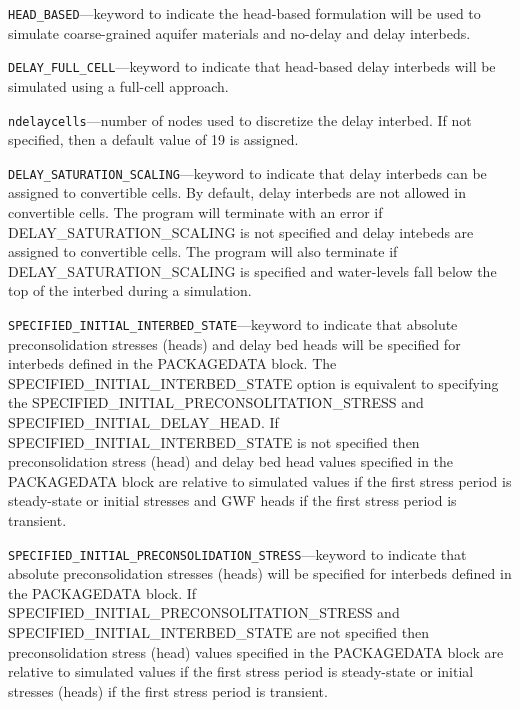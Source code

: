 \begin{description}
\item \texttt{HEAD\_BASED}---keyword to indicate the head-based formulation will be used to simulate coarse-grained aquifer materials and no-delay and delay interbeds.

\item \texttt{DELAY\_FULL\_CELL}---keyword to indicate that head-based delay interbeds will be simulated using a full-cell approach.

\item \texttt{ndelaycells}---number of nodes used to discretize the delay interbed. If not specified, then a default value of 19 is assigned.

\item \texttt{DELAY\_SATURATION\_SCALING}---keyword to indicate that delay interbeds can be assigned to convertible cells. By default, delay interbeds are not allowed in convertible cells. The program will terminate with an error if DELAY\_SATURATION\_SCALING is not specified and delay intebeds are assigned to convertible cells. The program will also terminate if DELAY\_SATURATION\_SCALING is specified and water-levels fall below the top of the interbed during a simulation.

\item \texttt{SPECIFIED\_INITIAL\_INTERBED\_STATE}---keyword to indicate that absolute preconsolidation stresses (heads) and delay bed heads will be specified for interbeds defined in the PACKAGEDATA block. The SPECIFIED\_INITIAL\_INTERBED\_STATE option is equivalent to specifying the SPECIFIED\_INITIAL\_PRECONSOLITATION\_STRESS and SPECIFIED\_INITIAL\_DELAY\_HEAD. If SPECIFIED\_INITIAL\_INTERBED\_STATE is not specified then preconsolidation stress (head) and delay bed head values specified in the PACKAGEDATA block are relative to simulated values if the first stress period is steady-state or initial stresses and GWF heads if the first stress period is transient.

\item \texttt{SPECIFIED\_INITIAL\_PRECONSOLIDATION\_STRESS}---keyword to indicate that absolute preconsolidation stresses (heads) will be specified for interbeds defined in the PACKAGEDATA block. If SPECIFIED\_INITIAL\_PRECONSOLITATION\_STRESS and SPECIFIED\_INITIAL\_INTERBED\_STATE are not specified then preconsolidation stress (head) values specified in the PACKAGEDATA block are relative to simulated values if the first stress period is steady-state or initial stresses (heads) if the first stress period is transient.


\end{description}
